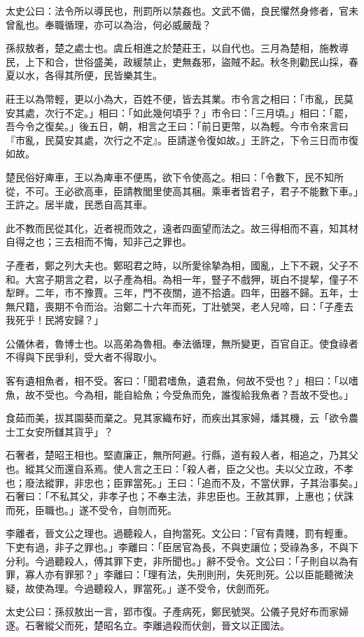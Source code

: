 
\begin{pinyinscope}
太史公曰：法令所以導民也，刑罰所以禁姦也。文武不備，良民懼然身修者，官未曾亂也。奉職循理，亦可以為治，何必威嚴哉？

孫叔敖者，楚之處士也。虞丘相進之於楚莊王，以自代也。三月為楚相，施教導民，上下和合，世俗盛美，政緩禁止，吏無姦邪，盜賊不起。秋冬則勸民山採，春夏以水，各得其所便，民皆樂其生。

莊王以為幣輕，更以小為大，百姓不便，皆去其業。市令言之相曰：「市亂，民莫安其處，次行不定。」相曰：「如此幾何頃乎？」市令曰：「三月頃。」相曰：「罷，吾今令之復矣。」後五日，朝，相言之王曰：「前日更幣，以為輕。今市令來言曰『市亂，民莫安其處，次行之不定』。臣請遂令復如故。」王許之，下令三日而市復如故。

楚民俗好庳車，王以為庳車不便馬，欲下令使高之。相曰：「令數下，民不知所從，不可。王必欲高車，臣請教閭里使高其梱。乘車者皆君子，君子不能數下車。」王許之。居半歲，民悉自高其車。

此不教而民從其化，近者視而效之，遠者四面望而法之。故三得相而不喜，知其材自得之也；三去相而不悔，知非己之罪也。

子產者，鄭之列大夫也。鄭昭君之時，以所愛徐摯為相，國亂，上下不親，父子不和。大宮子期言之君，以子產為相。為相一年，豎子不戲狎，斑白不提挈，僮子不犁畔。二年，市不豫賈。三年，門不夜關，道不拾遺。四年，田器不歸。五年，士無尺籍，喪期不令而治。治鄭二十六年而死，丁壯號哭，老人兒啼，曰：「子產去我死乎！民將安歸？」

公儀休者，魯博士也。以高弟為魯相。奉法循理，無所變更，百官自正。使食祿者不得與下民爭利，受大者不得取小。

客有遺相魚者，相不受。客曰：「聞君嗜魚，遺君魚，何故不受也？」相曰：「以嗜魚，故不受也。今為相，能自給魚；今受魚而免，誰復給我魚者？吾故不受也。」

食茹而美，拔其園葵而棄之。見其家織布好，而疾出其家婦，燔其機，云「欲令農士工女安所讎其貨乎」？

石奢者，楚昭王相也。堅直廉正，無所阿避。行縣，道有殺人者，相追之，乃其父也。縱其父而還自系焉。使人言之王曰：「殺人者，臣之父也。夫以父立政，不孝也；廢法縱罪，非忠也；臣罪當死。」王曰：「追而不及，不當伏罪，子其治事矣。」石奢曰：「不私其父，非孝子也；不奉主法，非忠臣也。王赦其罪，上惠也；伏誅而死，臣職也。」遂不受令，自刎而死。

李離者，晉文公之理也。過聽殺人，自拘當死。文公曰：「官有貴賤，罰有輕重。下吏有過，非子之罪也。」李離曰：「臣居官為長，不與吏讓位；受祿為多，不與下分利。今過聽殺人，傅其罪下吏，非所聞也。」辭不受令。文公曰：「子則自以為有罪，寡人亦有罪邪？」李離曰：「理有法，失刑則刑，失死則死。公以臣能聽微決疑，故使為理。今過聽殺人，罪當死。」遂不受令，伏劍而死。

太史公曰：孫叔敖出一言，郢市復。子產病死，鄭民號哭。公儀子見好布而家婦逐。石奢縱父而死，楚昭名立。李離過殺而伏劍，晉文以正國法。


\end{pinyinscope}